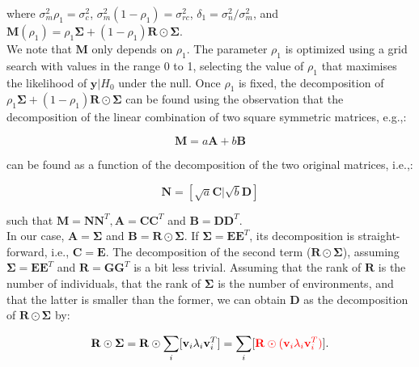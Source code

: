 where $\sigma_m^2\rho_1 = \sigma_c^2$,
$\sigma_m^2(1-\rho_1) = \sigma_{rc}^2$,
$\delta_1 = \sigma_n^2/\sigma_m^2$, and $\mathbf{M}(\rho_1) = \rho_1\boldsymbol{\Sigma} + (1-\rho_1) \mathbf{R} \odot \boldsymbol{\Sigma}$.\\

We note that $\mathbf{M}$ only depends on $\rho_1$. 
The parameter $\rho_1$ is optimized using a grid search with values in the range 0 to 1, selecting the value of $\rho_1$ that maximises the likelihood of $\mathbf{y}|H_0$ under the null.
Once $\rho_1$ is fixed, the decomposition of $\rho_1\boldsymbol{\Sigma} + (1-\rho_1) \mathbf{R} \odot \boldsymbol{\Sigma}$ can be found using the observation that the decomposition of the linear combination of two square symmetric matrices, e.g.,:

\begin{equation}
    \mathbf{M} = a\mathbf{A} + b\mathbf{B}
\end{equation}

can be found as a function of the decomposition of the two original matrices, i.e.,:

\begin{equation}
    \mathbf{N} = [\sqrt{a}\mathbf{C} | \sqrt{b}\mathbf{D}]
\end{equation}

such that $\mathbf{M}=\mathbf{N}\mathbf{N}^T, \mathbf{A}=\mathbf{C}\mathbf{C}^T$ and $\mathbf{B}=\mathbf{D}\mathbf{D}^T$. \\

In our case, $\mathbf{A} = \boldsymbol{\Sigma}$ and $\mathbf{B} = \mathbf{R} \odot \boldsymbol{\Sigma}$.
If $\boldsymbol{\Sigma} = \mathbf{E}\mathbf{E}^T$, its decomposition is straight-forward, i.e., $\mathbf{C} = \mathbf{E}$.
The decomposition of the second term ($ \mathbf{R} \odot \boldsymbol{\Sigma}$), assuming $\boldsymbol{\Sigma} = \mathbf{E}\mathbf{E}^T$ and $\mathbf{R} = \mathbf{G}\mathbf{G}^T$ is a bit less trivial.
Assuming that the rank of $\mathbf{R}$ is the number of individuals, that the rank of $\boldsymbol{\Sigma}$ is the number of environments, and that the latter is smaller than the former, we can obtain $\mathbf{D}$ as the decomposition of $\mathbf{R} \odot \boldsymbol{\Sigma}$ by:

\begin{equation}
    \mathbf{R} \odot \boldsymbol{\Sigma} = \mathbf{R} \odot \sum_i[\mathbf{v}_i \lambda_i \mathbf{v}_i^T] = \sum_i[\textcolor{red}{\mathbf{R} \odot (\mathbf{v}_i \lambda_i \mathbf{v}_i^T)}].
\end{equation}

